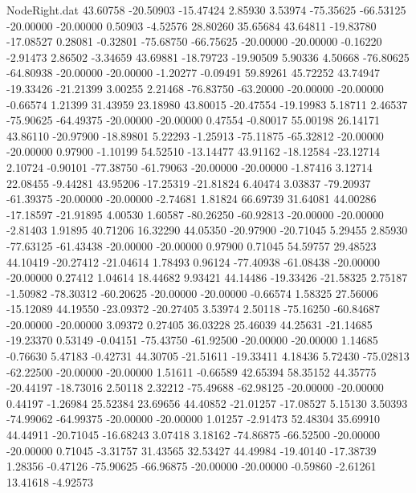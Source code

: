 \begin{filecontents}{NodeRight.dat}
  43.60758  -20.50903  -15.47424     2.85930    3.53974  -75.35625  -66.53125  -20.00000  -20.00000    0.50903   -4.52576   28.80260   35.65684
  43.64811  -19.83780  -17.08527     0.28081   -0.32801  -75.68750  -66.75625  -20.00000  -20.00000   -0.16220   -2.91473    2.86502   -3.34659
  43.69881  -18.79723  -19.90509     5.90336    4.50668  -76.80625  -64.80938  -20.00000  -20.00000   -1.20277   -0.09491   59.89261   45.72252
  43.74947  -19.33426  -21.21399     3.00255    2.21468  -76.83750  -63.20000  -20.00000  -20.00000   -0.66574    1.21399   31.43959   23.18980
  43.80015  -20.47554  -19.19983     5.18711    2.46537  -75.90625  -64.49375  -20.00000  -20.00000    0.47554   -0.80017   55.00198   26.14171
  43.86110  -20.97900  -18.89801     5.22293   -1.25913  -75.11875  -65.32812  -20.00000  -20.00000    0.97900   -1.10199   54.52510  -13.14477
  43.91162  -18.12584  -23.12714     2.10724   -0.90101  -77.38750  -61.79063  -20.00000  -20.00000   -1.87416    3.12714   22.08455   -9.44281
  43.95206  -17.25319  -21.81824     6.40474    3.03837  -79.20937  -61.39375  -20.00000  -20.00000   -2.74681    1.81824   66.69739   31.64081
  44.00286  -17.18597  -21.91895     4.00530    1.60587  -80.26250  -60.92813  -20.00000  -20.00000   -2.81403    1.91895   40.71206   16.32290
  44.05350  -20.97900  -20.71045     5.29455    2.85930  -77.63125  -61.43438  -20.00000  -20.00000    0.97900    0.71045   54.59757   29.48523
  44.10419  -20.27412  -21.04614     1.78493    0.96124  -77.40938  -61.08438  -20.00000  -20.00000    0.27412    1.04614   18.44682    9.93421
  44.14486  -19.33426  -21.58325     2.75187   -1.50982  -78.30312  -60.20625  -20.00000  -20.00000   -0.66574    1.58325   27.56006  -15.12089
  44.19550  -23.09372  -20.27405     3.53974    2.50118  -75.16250  -60.84687  -20.00000  -20.00000    3.09372    0.27405   36.03228   25.46039
  44.25631  -21.14685  -19.23370     0.53149   -0.04151  -75.43750  -61.92500  -20.00000  -20.00000    1.14685   -0.76630    5.47183   -0.42731
  44.30705  -21.51611  -19.33411     4.18436    5.72430  -75.02813  -62.22500  -20.00000  -20.00000    1.51611   -0.66589   42.65394   58.35152
  44.35775  -20.44197  -18.73016     2.50118    2.32212  -75.49688  -62.98125  -20.00000  -20.00000    0.44197   -1.26984   25.52384   23.69656
  44.40852  -21.01257  -17.08527     5.15130    3.50393  -74.99062  -64.99375  -20.00000  -20.00000    1.01257   -2.91473   52.48304   35.69910
  44.44911  -20.71045  -16.68243     3.07418    3.18162  -74.86875  -66.52500  -20.00000  -20.00000    0.71045   -3.31757   31.43565   32.53427
  44.49984  -19.40140  -17.38739     1.28356   -0.47126  -75.90625  -66.96875  -20.00000  -20.00000   -0.59860   -2.61261   13.41618   -4.92573

\end{filecontents}
